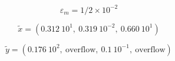 \[ \varepsilon_m=1/2 \times 10^{-2} \]

\medskip
\[ \widetilde{x}=(0.312\ 10^1, \ 0.319\ 10^{-2}, \ 0.660\ 10^1) \]

\medskip
\[ \widetilde{y}=( 0.176\ 10^2,\ \mbox{overflow}, \ 0.1\ 10^{-1}, \ \mbox{overflow}) \]
